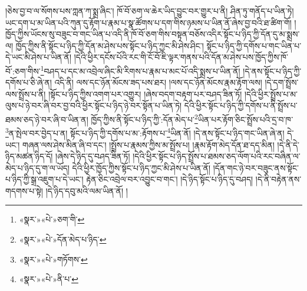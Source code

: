 །ཅེས་བྱ་བ་ལ་སོགས་པས་ཀླན་ཀ་སྨྲ་ཞིང་། ཁོ་བོ་ཅག་ལ་ཆེར་ཡིད་བྱུང་བར་གྱུར་པ་ནི། ཤིན་ཏུ་གནོད་པ་ཡིན་ཏེ། ཡང་དག་པ་མ་ཡིན་པའི་ཀུན་དུ་རྟོག་པ་རྣམ་པ་སྣ་ཚོགས་པ་དག་གིས་ཉམས་པ་ཡིན་ནོ་ཞེས་བྱ་བའི་ཐ་ཚིག་གོ། །ཁྱོད་ཀྱིས་ཡོངས་སུ་བཟུང་བ་གང་ཡིན་པ་འདི་ནི་ཁོ་བོ་ཅག་གིས་བསྟན་བཅོས་འདིར་སྟོང་པ་ཉིད་ཀྱི་དོན་དུ་མ་སྨྲས་ལ། ཁྱོད་ཀྱིས་ནི་སྟོང་པ་ཉིད་ཀྱི་དོན་མ་ཤེས་པས་སྟོང་པ་ཉིད་ཀྱང་མི་ཤེས་ཤིང་། སྟོང་པ་ཉིད་ཀྱི་དགོས་པ་གང་ཡིན་པ་དེ་ཡང་མི་ཤེས་པ་ཡིན་ནོ། །དེའི་ཕྱིར་དངོས་པོའི་རང་གི་ངོ་བོ་ཇི་ལྟར་གནས་པའི་དོན་མ་ཤེས་པས་ཁྱོད་ཀྱིས་ཁོ་བོ་:ཅག་གིས་\footnote{«སྣར་»«པེ་»ཅག་གི་}བཤད་པ་དང་མ་འབྲེལ་ཞིང་མི་རིགས་པ་རྣམ་པ་མང་པོ་འདི་སྨྲས་པ་ཡིན་ནོ། །དེ་ནས་སྟོང་པ་ཉིད་ཀྱི་དགོས་པ་ཅི་ཞེ་ན། འདི་ནི། ལས་དང་ཉོན་མོངས་ཟད་པས་ཐར། །ལས་དང་ཉོན་མོངས་རྣམ་རྟོག་ལས། །དེ་དག་སྤྲོས་ལས་སྤྲོས་པ་ནི། །སྟོང་པ་ཉིད་ཀྱིས་འགག་པར་འགྱུར། །ཞེས་བདག་བརྟག་པར་བཤད་ཟིན་ཏོ། །དེའི་ཕྱིར་སྤྲོས་པ་མ་ལུས་པ་ཉེ་བར་ཞི་བར་བྱ་བའི་ཕྱིར་སྟོང་པ་ཉིད་ཉེ་བར་སྟོན་པ་ཡིན་ཏེ། དེའི་ཕྱིར་སྟོང་པ་ཉིད་ཀྱི་དགོས་པ་ནི་སྤྲོས་པ་ཐམས་ཅད་ཉེ་བར་ཞི་བ་ཡིན་ན། ཁྱོད་ཀྱིས་ནི་སྟོང་པ་ཉིད་ཀྱི་:དོན་མེད་པ་\footnote{«སྣར་»«པེ་»དོན་མེད་པ་ཉིད་}ཡིན་པར་རྟོག་ཅིང་སྤྲོས་པའི་དྲ་བ་ཁ་\footnote{«སྣར་»«པེ་»གཏོགས་}ན་སྤེལ་བར་བྱེད་པ་ན། སྟོང་པ་ཉིད་ཀྱི་དགོས་པ་མ་:རྟོགས་པ་\footnote{«སྣར་»«པེ་»ནི་པ་}ཡིན་ནོ། །དེ་ནས་སྟོང་པ་ཉིད་གང་ཡིན་ཞེ་ན། དེ་ཡང་། གཞན་ལས་ཤེས་མིན་ཞི་བ་དང་། །སྤྲོས་པ་རྣམས་ཀྱིས་མ་སྤྲོས་པ། །རྣམ་རྟོག་མེད་དོན་ཐ་དད་མིན། །དེ་ནི་དེ་ཉིད་མཚན་ཉིད་དོ། །ཞེས་དེ་ཉིད་དུ་བཤད་ཟིན་ཏོ། །དེའི་ཕྱིར་སྟོང་པ་ཉིད་སྤྲོས་པ་ཐམས་ཅད་ལོག་པའི་རང་བཞིན་ལ་མེད་པ་ཉིད་དུ་ག་ལ་ཡོད། དེའི་ཕྱིར་ཁྱོད་ཀྱིས་སྟོང་པ་ཉིད་ཀྱང་མི་ཤེས་པ་ཡིན་ནོ། །དོན་གང་ཉེ་བར་བཟུང་ནས་སྟོང་པ་ཉིད་ཀྱི་སྒྲ་འཇུག་པ་དེ་ཡང་། རྟེན་ཅིང་འབྲེལ་བར་འབྱུང་བ་གང་། །དེ་ཉིད་སྟོང་པ་ཉིད་དུ་བཤད། །དེ་ནི་བརྟེན་ནས་གདགས་པ་སྟེ། །དེ་ཉིད་དབུ་མའི་ལམ་ཡིན་ནོ། །
